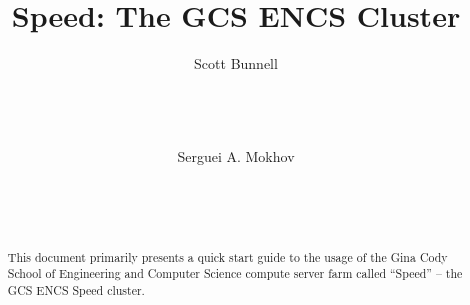 \documentclass{easychair}
\begin{document}
%
\title{Speed: The GCS ENCS Cluster}

%

%
\author{
    Scott Bunnell\\
    \\
    \\
    \\
\and
    Serguei A. Mokhov\\
    \\
    \\
    \\
}

%

\maketitle

\begin{abstract}
This document primarily presents a quick start
guide to the usage of the Gina Cody School of
Engineering and Computer Science compute server farm
called ``Speed'' -- the GCS ENCS Speed cluster.
\end{abstract}

\tableofcontents
\clearpage

\end{document}
